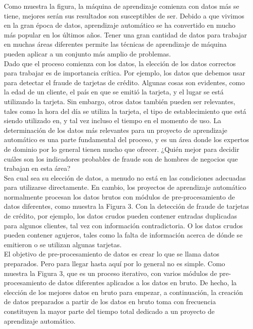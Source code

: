 \documentclass[11pt]{article}
\begin{document}
Como muestra la figura, la máquina de aprendizaje comienza con datos más se tiene, mejores serán sus resultados son susceptibles de ser. Debido a que vivimos en la gran época de datos, aprendizaje automático se ha convertido en mucho más popular en los últimos años. Tener una gran cantidad de datos para trabajar en muchas áreas diferentes permite las técnicas de aprendizaje de máquina pueden aplicar a un conjunto más amplio de problemas.\\


Dado que el proceso comienza con los datos, la elección de los datos correctos para trabajar es de importancia crítica. Por ejemplo, los datos que debemos usar para detectar el fraude de tarjetas de crédito. Algunas cosas son evidentes, como la edad de un cliente, el país en que se emitió la tarjeta, y el lugar se está utilizando la tarjeta. Sin embargo, otros datos también pueden ser relevantes, tales como la hora del día se utiliza la tarjeta, el tipo de establecimiento que está siendo utilizado en, y tal vez incluso el tiempo en el momento de uso. La determinación de los datos más relevantes para un proyecto de aprendizaje automático es una parte fundamental del proceso, y es un área donde los expertos de dominio por lo general tienen mucho que ofrecer. ¿Quién mejor para decidir cuáles son los indicadores probables de fraude son de hombres de negocios que trabajan en esta área?\\

Sea cual sea su elección de datos, a menudo no está en las condiciones adecuadas para utilizarse directamente. En cambio, los proyectos de aprendizaje automático normalmente procesan los datos brutos con módulos de pre-procesamiento de datos diferentes, como muestra la Figura 3. Con la detección de fraude de tarjetas de crédito, por ejemplo, los datos crudos pueden contener entradas duplicadas para algunos clientes, tal vez con información contradictoria. O los datos crudos pueden contener agujeros, tales como la falta de información acerca de dónde se emitieron o se utilizan algunas tarjetas.\\

El objetivo de pre-procesamiento de datos es crear lo que se llama datos preparados. Pero para llegar hasta aquí por lo general no es simple. Como muestra la Figura 3, que es un proceso iterativo, con varios módulos de pre-procesamiento de datos diferentes aplicados a los datos en bruto. De hecho, la elección de los mejores datos en bruto para empezar, a continuación, la creación de datos preparados a partir de los datos en bruto toma con frecuencia constituyen la mayor parte del tiempo total dedicado a un proyecto de aprendizaje automático.\\
\end{document}
